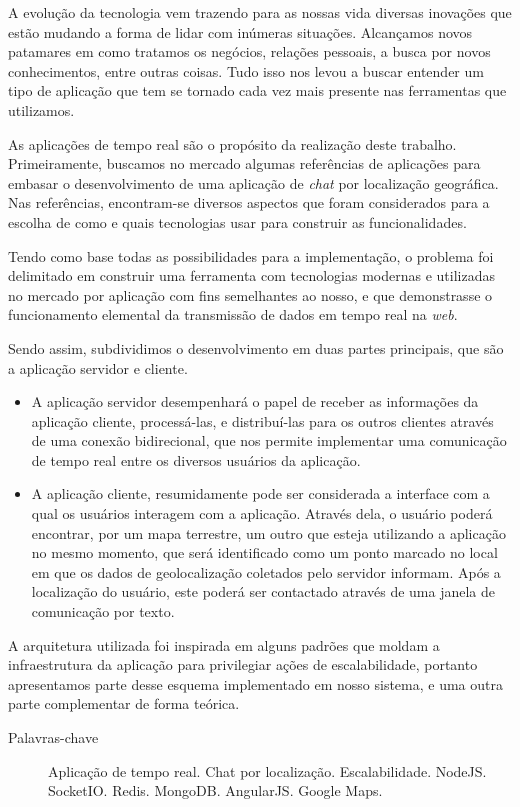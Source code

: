 \documentclass[brazil,ruledheader]{abntifes}
\begin{document}
	\begin{resumo}
		A evolução da tecnologia vem trazendo para as nossas vida diversas inovações que estão mudando a forma de lidar com inúmeras situações. Alcançamos novos patamares em como tratamos os negócios, relações pessoais, a busca por novos conhecimentos, entre outras coisas. Tudo isso nos levou a buscar entender um tipo de aplicação que tem se tornado cada vez mais presente nas ferramentas que utilizamos.
		
		As aplicações de tempo real são o propósito da realização deste trabalho. Primeiramente, buscamos no mercado algumas referências de aplicações para embasar o desenvolvimento de uma aplicação de \textit{chat} por localização geográfica. Nas referências, encontram-se diversos aspectos que foram considerados para a escolha de como e quais tecnologias usar para construir as funcionalidades.
		
		Tendo como base todas as possibilidades para a implementação, o problema foi delimitado em construir uma ferramenta com tecnologias modernas e utilizadas no mercado por aplicação com fins semelhantes ao nosso, e que demonstrasse o funcionamento elemental da transmissão de dados em tempo real na \textit{web}.
		
		Sendo assim, subdividimos o desenvolvimento em duas partes principais, que são a aplicação servidor e cliente. 
		
		\begin{itemize}
			\item A aplicação servidor desempenhará o papel de receber as informações da aplicação cliente, processá-las, e distribuí-las para os outros clientes através de uma conexão bidirecional, que nos permite implementar uma comunicação de tempo real entre os diversos usuários da aplicação.
		\end{itemize}
		
		\begin{itemize}
			\item  A aplicação cliente, resumidamente pode ser considerada a interface com a qual os usuários interagem com a aplicação. Através dela, o usuário poderá encontrar, por um mapa terrestre, um outro que esteja utilizando a aplicação no mesmo momento, que será identificado como um ponto marcado no local em que os dados de geolocalização coletados pelo servidor informam. Após a localização do usuário, este poderá ser contactado através de uma janela de comunicação por texto.
		\end{itemize}
		
		A arquitetura utilizada foi inspirada em alguns padrões que moldam a infraestrutura da aplicação para privilegiar ações de escalabilidade, portanto apresentamos parte desse esquema implementado em nosso sistema, e uma outra parte complementar de forma teórica.
		
		\begin{description}
			\item[Palavras-chave] Aplicação de tempo real. Chat por localização. Escalabilidade. NodeJS. SocketIO. Redis. MongoDB. AngularJS. Google Maps.
		\end{description}
		
	\end{resumo}
	
\end{document}
